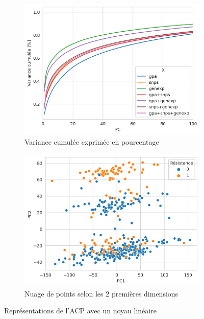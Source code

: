 \documentclass[11pt]{article}
\begin{document}
  \begin{figure}[H]
    \centering
    \begin{subfigure}[b]{0.49\textwidth}
      \centering
      \includegraphics[width=\textwidth]{pca_var}
      \caption{Variance cumulée exprimée en pourcentage}
      \label{fig:pca_var}
    \end{subfigure}
    \hfill
    \begin{subfigure}[b]{0.49\textwidth}
      \centering
      \includegraphics[width=\textwidth]{pca}
      \caption{Nuage de points selon les 2 premières dimensions}
      \label{fig:pca_proj}
    \end{subfigure}
    \hfill
    \caption{Représentations de l'ACP avec un noyau linéaire}
    \label{fig:pca}
  \end{figure}
\end{document}
